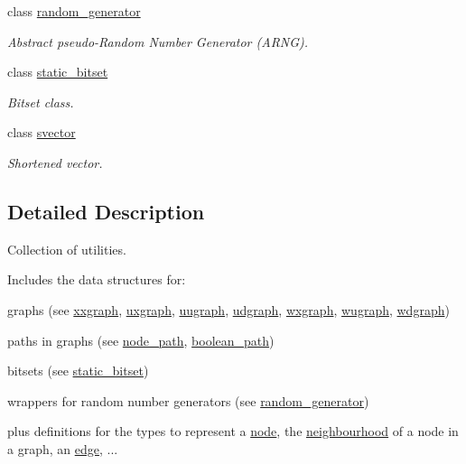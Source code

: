 \begin{DoxyCompactItemize}
class \hyperlink{classlgraph_1_1utils_1_1random__generator}{random\+\_\+generator}
\begin{DoxyCompactList}\small\item\em Abstract pseudo-\/\+Random Number Generator (A\+R\+NG). \end{DoxyCompactList}\item 
class \hyperlink{classlgraph_1_1utils_1_1static__bitset}{static\+\_\+bitset}
\begin{DoxyCompactList}\small\item\em Bitset class. \end{DoxyCompactList}\item 
class \hyperlink{classlgraph_1_1utils_1_1svector}{svector}
\begin{DoxyCompactList}\small\item\em Shortened vector. \end{DoxyCompactList}\end{DoxyCompactItemize}


\subsection{Detailed Description}
Collection of utilities. 

Includes the data structures for\+:
\begin{DoxyItemize}
\item graphs (see \hyperlink{classlgraph_1_1xxgraph}{xxgraph}, \hyperlink{classlgraph_1_1uxgraph}{uxgraph}, \hyperlink{classlgraph_1_1uugraph}{uugraph}, \hyperlink{classlgraph_1_1udgraph}{udgraph}, \hyperlink{classlgraph_1_1wxgraph}{wxgraph}, \hyperlink{classlgraph_1_1wugraph}{wugraph}, \hyperlink{classlgraph_1_1wdgraph}{wdgraph})
\item paths in graphs (see \hyperlink{classlgraph_1_1node__path}{node\+\_\+path}, \hyperlink{classlgraph_1_1boolean__path}{boolean\+\_\+path})
\item bitsets (see \hyperlink{classlgraph_1_1utils_1_1static__bitset}{static\+\_\+bitset})
\item wrappers for random number generators (see \hyperlink{classlgraph_1_1utils_1_1random__generator}{random\+\_\+generator})
\end{DoxyItemize}

plus definitions for the types to represent a \hyperlink{namespacelgraph_a397169dd66adf725210a30fb7251773e}{node}, the \hyperlink{namespacelgraph_a052e7766c13f3a43cec0aec8173fdede}{neighbourhood} of a node in a graph, an \hyperlink{namespacelgraph_a76bd7d50719f03de7a85db259d80d572}{edge}, ... 